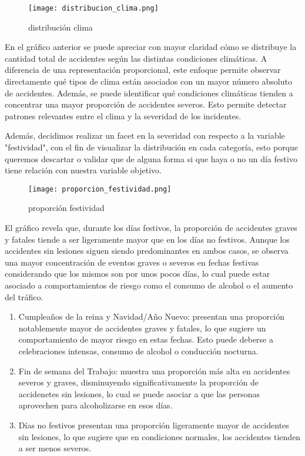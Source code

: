 \documentclass{book}
\begin{document}
\begin{figure}[htbp]
\centering
\texttt{[image: distribucion\_clima.png]}
\caption{\label{fig:distribución clima}distribución clima}
\end{figure}

En el gráfico anterior se puede apreciar con mayor claridad cómo se distribuye la cantidad total de accidentes según las distintas condiciones climáticas. A diferencia de una representación proporcional, este enfoque permite observar directamente qué tipos de clima están asociados con un mayor número absoluto de accidentes. Además, se puede identificar qué condiciones climáticas tienden a concentrar una mayor proporción de accidentes severos. Esto permite detectar patrones relevantes entre el clima y la severidad de los incidentes.

Además, decidimos realizar un facet en la severidad con respecto a la variable "festividad", con el fin de visualizar la distribución en cada categoría, esto porque queremos descartar o validar que de alguna forma si que haya o no un día festivo tiene relación con nuestra variable objetivo.

\begin{figure}[htbp]
\centering
\texttt{[image: proporcion\_festividad.png]}
\caption{\label{fig:proporción festividad}proporción festividad}
\end{figure}

El gráfico revela que, durante los días festivos, la proporción de accidentes graves y fatales tiende a ser ligeramente mayor que en los días no festivos. Aunque los accidentes sin lesiones siguen siendo predominantes en ambos casos, se observa una mayor concentración de eventos graves o severos en fechas festivas considerando que los mismos son por unos pocos días, lo cual puede estar asociado a comportamientos de riesgo como el consumo de alcohol o el aumento del tráfico.

\begin{enumerate}

\item Cumpleaños de la reina y Navidad/Año Nuevo: presentan una proporción notablemente mayor de accidentes graves y fatales, lo que sugiere un comportamiento de mayor riesgo en estas fechas. Esto puede deberse a celebraciones intensas, consumo de alcohol o conducción nocturna.

\item Fin de semana del Trabajo: muestra una proporción más alta en accidentes severos y graves, disminuyendo significativamente la proporción de accidenetes sin lesiones, lo cual se puede asociar a que las personas aprovechen para alcoholizarse en esos días.

\item Días no festivos presentan una proporción ligeramente mayor de accidentes sin lesiones, lo que sugiere que en condiciones normales, los accidentes tienden a ser menos severos.

\end{enumerate}
\end{document}
